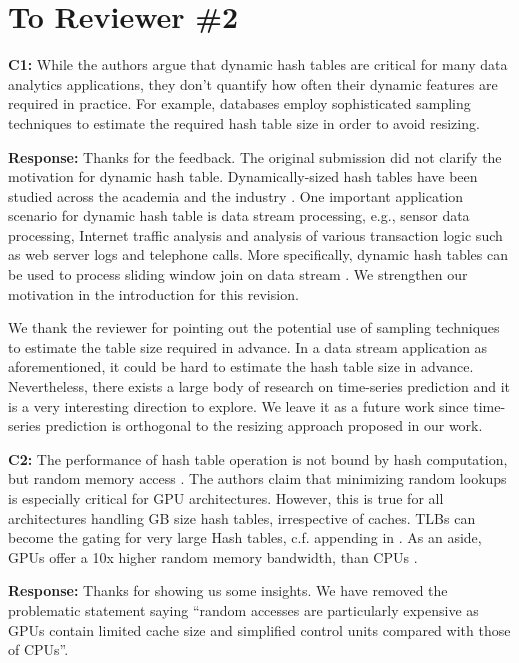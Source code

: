 \section*{To Reviewer \#2}

\begin{shaded}
	\noindent\textbf{C1:} While the authors argue that dynamic hash tables are critical for many data analytics applications, they don't quantify how often their dynamic features are required in practice. For example, databases employ sophisticated sampling techniques to estimate the required hash table size in order to avoid resizing. 
\end{shaded}
%
\noindent\textbf{Response:} 
Thanks for the feedback. The original submission did not clarify the motivation for dynamic hash table. Dynamically-sized hash tables have been studied across the academia \cite{liu2014dynamic,ashkiani2018dynamic} and the industry \cite{larson2003scaleable,douceur2000hash}. 
One important application scenario for dynamic hash table is data stream processing, e.g., sensor data processing, Internet traffic analysis and analysis of various transaction logic such as web server logs and telephone calls. 
More specifically, dynamic hash tables can be used to process sliding window join on data stream \cite{golab2003processing}. We strengthen our motivation in the introduction for this revision.

We thank the reviewer for pointing out the potential use of sampling techniques to estimate the table size required in advance. In a data stream application as aforementioned, it could be hard to estimate the hash table size in advance. Nevertheless, there exists a large body of research on time-series prediction and it is a very interesting direction to explore. We leave it as a future work since time-series prediction is orthogonal to the resizing approach proposed in our work. 



\begin{shaded}
	\noindent\textbf{C2:} The performance of hash table operation is not bound by hash computation, but random memory access \cite{GPU-Join-A}. The authors claim that minimizing random lookups is especially critical for GPU architectures. However, this is true for all architectures handling GB size hash tables, irrespective of caches. TLBs can become the gating for very large Hash tables, c.f. appending in \cite{kaldewey2012gpu}. As an aside, GPUs offer a 10x higher random memory bandwidth, than CPUs \cite{GPU-Join-B}.
\end{shaded}
%
\noindent\textbf{Response:} 
Thanks for showing us some insights. 
We have removed the problematic statement saying ``random accesses are particularly expensive as GPUs contain limited cache size and simplified control units compared with those of CPUs''.

